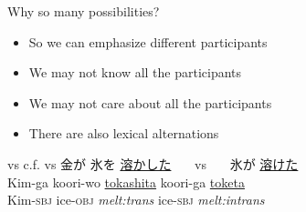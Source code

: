 \begin{frame}{Why so many possibilities?}

\begin{itemize}
\item So we can emphasize different participants
\item We may not know all the participants
\item We may not care about all the participants
\item There are also lexical alternations
\end{itemize}
\begin{exe}
\ex {} vs 
\ex c.f.  vs 
\ex \glll 金が 氷を \ul{溶かした}  {~~~vs~~~}  氷が \ul{溶けた} \\ 
Kim-ga koori-wo \ul{tokashita}  {} koori-ga \ul{toketa} \\
  Kim-\textsc{sbj} ice-\textsc{obj} \textit{melt:trans} 
{} ice-\textsc{sbj} \textit{melt:intrans} \\
\end{exe}


\end{frame}


